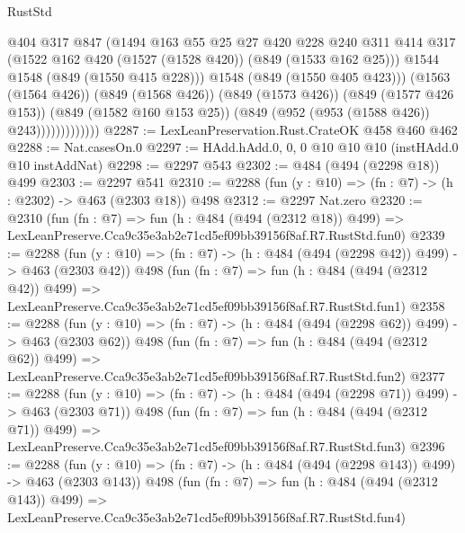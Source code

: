 \begin{lexlean}{RustStd}
\begin{coremodule}
                            @404
                            @317
                            @847
                            (@1494
                              @163
                              @55
                              @25
                              @27
                              @420
                              @228
                              @240
                              @311
                              @414
                              @317
                              (@1522 @162 @420 (@1527 (@1528 @420)) (@849 (@1533 @162 @25)))
                              @1544
                              @1548
                              (@849 (@1550 @415 @228)))
                            @1548
                            (@849 (@1550 @405 @423)))
                          (@1563 (@1564 @426))
                          (@849 (@1568 @426))
                          (@849 (@1573 @426))
                          (@849 (@1577 @426 @153))
                          (@849 (@1582 @160 @153 @25))
                          (@849 (@952 (@953 (@1588 @426)) @243)))))))))))))
@2287 := LexLeanPreservation.Rust.CrateOK @458 @460 @462
@2288 := Nat.casesOn.{0}
@2297 := HAdd.hAdd.{0, 0, 0} @10 @10 @10 (instHAdd.{0} @10 instAddNat)
@2298 := @2297 @543
@2302 := @484 (@494 (@2298 @18)) @499
@2303 := @2297 @541
@2310 := @2288 (fun (y : @10) => (fn : @7) -> (h : @2302) -> @463 (@2303 @18)) @498
@2312 := @2297 Nat.zero
@2320 := @2310
    (fun (fn : @7) =>
    fun (h : @484 (@494 (@2312 @18)) @499) =>
    LexLeanPreserve.Cca9c35e3ab2e71cd5ef09bb39156f8af.R7.RustStd.fun0)
@2339 := @2288
    (fun (y : @10) => (fn : @7) -> (h : @484 (@494 (@2298 @42)) @499) -> @463 (@2303 @42))
    @498
    (fun (fn : @7) =>
    fun (h : @484 (@494 (@2312 @42)) @499) =>
    LexLeanPreserve.Cca9c35e3ab2e71cd5ef09bb39156f8af.R7.RustStd.fun1)
@2358 := @2288
    (fun (y : @10) => (fn : @7) -> (h : @484 (@494 (@2298 @62)) @499) -> @463 (@2303 @62))
    @498
    (fun (fn : @7) =>
    fun (h : @484 (@494 (@2312 @62)) @499) =>
    LexLeanPreserve.Cca9c35e3ab2e71cd5ef09bb39156f8af.R7.RustStd.fun2)
@2377 := @2288
    (fun (y : @10) => (fn : @7) -> (h : @484 (@494 (@2298 @71)) @499) -> @463 (@2303 @71))
    @498
    (fun (fn : @7) =>
    fun (h : @484 (@494 (@2312 @71)) @499) =>
    LexLeanPreserve.Cca9c35e3ab2e71cd5ef09bb39156f8af.R7.RustStd.fun3)
@2396 := @2288
    (fun (y : @10) => (fn : @7) -> (h : @484 (@494 (@2298 @143)) @499) -> @463 (@2303 @143))
    @498
    (fun (fn : @7) =>
    fun (h : @484 (@494 (@2312 @143)) @499) =>
    LexLeanPreserve.Cca9c35e3ab2e71cd5ef09bb39156f8af.R7.RustStd.fun4)

\end{coremodule}
\end{lexlean}
